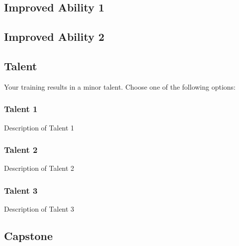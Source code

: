 \vspace{.1 in}

\subsection*{Improved Ability 1}
\lipsum[1]

\vspace{.1 in}

\subsection*{Improved Ability 2}
\lipsum[1]

\vspace{.1 in}

\subsection*{Talent}
Your training results in a minor talent. Choose one of the following options:

\subsubsection{Talent 1}
Description of Talent 1

\subsubsection{Talent 2}
Description of Talent 2

\subsubsection{Talent 3}
Description of Talent 3

\vspace{.1 in}

\subsection*{Capstone}
\lipsum[1]
